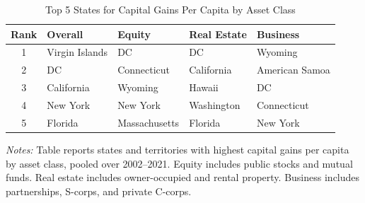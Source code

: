\documentclass[12pt]{article}
\begin{document}
\begin{table}[H]
\centering
\caption{Top 5 States for Capital Gains Per Capita by Asset Class}
\label{tab:kg_state_asset}
\small
\begin{tabular}{cllll}
\toprule
Rank & Overall & Equity & Real Estate & Business \\
\midrule
1 & Virgin Islands & DC          & DC          & Wyoming \\
2 & DC             & Connecticut & California  & American Samoa \\
3 & California     & Wyoming     & Hawaii      & DC \\
4 & New York       & New York    & Washington  & Connecticut \\
5 & Florida        & Massachusetts & Florida   & New York \\
\bottomrule
\end{tabular}
\begin{minipage}{0.9\textwidth}
\vspace{0.5em}
\footnotesize
\textit{Notes:} Table reports states and territories with highest capital gains per capita by asset class, pooled over 2002--2021. Equity includes public stocks and mutual funds. Real estate includes owner-occupied and rental property. Business includes partnerships, S-corps, and private C-corps.
\end{minipage}
\end{table}
\end{document}

